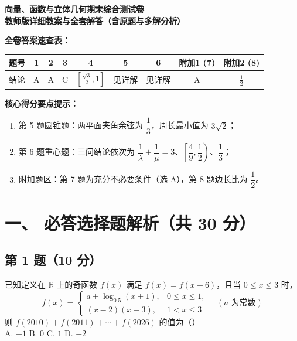 \documentclass[11pt,a4paper,fontset=fandol]{ctexart}
\begin{document}
\begin{center}
{\Large\bfseries 向量、函数与立体几何期末综合测试卷}\\[0.4em]
{\Large\bfseries 教师版详细教案与全套解答（含原题与多解分析）}
\end{center}

\begin{answerbox}
\textbf{全卷答案速查表：}
\begin{center}
\begin{tabular}{c|cccccc|cc}
\toprule
题号 & 1 & 2 & 3 & 4 & 5 & 6 & 附加1 (7) & 附加2 (8)\\
\midrule
结论 & A & A & C & $[\frac{\sqrt3}{2},1]$ & 见详解 & 见详解 & A & $\frac12$\\
\bottomrule
\end{tabular}
\end{center}
\textbf{核心得分要点提示：}
\begin{enumerate}[leftmargin=1.5em,label=\arabic*.]
  \item 第 5 题圆锥题：两平面夹角余弦为 $\dfrac{1}{3}$，周长最小值为 $3\sqrt{2}$；
  \item 第 6 题重心题：三问结论依次为 $\dfrac{1}{\lambda}+\dfrac{1}{\mu}=3$、$\left[\dfrac{4}{9},\dfrac{1}{2}\right)$、$\dfrac{1}{3}$；
  \item 附加题区：第 7 题为充分不必要条件（选 A），第 8 题边长比为 $\dfrac{1}{2}$。
\end{enumerate}
\end{answerbox}

\vspace{1em}

\section*{一、 必答选择题解析（共 30 分）}

\subsection*{第 1 题（10 分）}

\begin{problembox}
已知定义在 \(\mathbb{R}\) 上的奇函数 \(f(x)\) 满足 \(f(x) = f(x - 6)\)，且当 \(0 \le x \le 3\) 时，
\[
f(x) = \begin{cases} 
a + \log_{0.5}(x + 1), & 0 \le x \le 1,\\[0.3em]
(x - 2)(x - 3), & 1 < x \le 3
\end{cases} \quad (a \text{ 为常数})
\]
则 \(f(2010) + f(2011) + \cdots + f(2026)\) 的值为（\qquad）\\[0.4em]
A. \(-1\) \qquad\qquad\qquad B. \(0\) \qquad\qquad\qquad C. \(1\) \qquad\qquad\qquad D. \(-2\)
\end{problembox}
\end{document}
